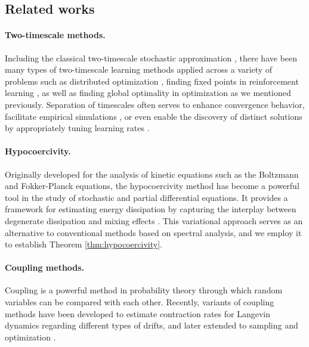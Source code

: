 \documentclass[11pt]{article}
\newcommand{\1}{\mathds{1}}
\begin{document}
\subsection{Related works}
\paragraph{Two-timescale methods.} Including the classical two-timescale stochastic approximation \cite{borkar2008stochastic, konda2004convergence}, there have been many types of two-timescale learning methods applied across a variety of problems such as distributed optimization  \cite{lan2020communication, chang2020distributed}, finding fixed points in reinforcement learning \cite{daskalakis2020independent, dalal2020tale, angiuli2022unified, ding2020natural}, as well as finding global optimality in optimization as we mentioned previously. Separation of timescales often serves to enhance convergence behavior, facilitate empirical simulations \cite{berthier2024learning}, or even enable the discovery of distinct solutions by appropriately tuning learning rates \cite{angiuli2022unified}.


\paragraph{Hypocoercivity.} Originally developed for the analysis of kinetic equations such as the Boltzmann and Fokker-Planck equations, the hypocoercivity method \cite{villani2009hypocoercivity} has become a powerful tool in the study of stochastic and partial differential equations. It provides a framework for estimating energy dissipation by capturing the interplay between degenerate dissipation and mixing effects \cite{dolbeault2015hypocoercivity, grothaus2014hypocoercivity, roussel2018spectral, cao2023explicit}. This variational approach serves as an alternative to conventional methods based on spectral analysis, and we employ it to establish Theorem \ref{thm:hypocoercivity}.



\paragraph{Coupling methods.} Coupling is a powerful method in probability theory through which random variables can be compared with each other. Recently, variants of coupling methods have been developed to estimate contraction rates for Langevin dynamics \cite{eberle2016reflection, eberle2019couplings,schuh2024global} regarding different types of drifts, and later extended to sampling and optimization \cite{durmus2017nonasymptotic, cheng2018sharp, cheng2018underdamped, mou2022improved}.
\end{document}
